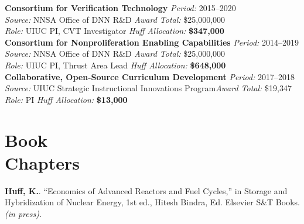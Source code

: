 \documentclass[margin,line]{resume}
\begin{document}
\begin{resume}
    \textbf{Consortium for Verification Technology} \hfill \textsl{Period:} 2015--2020\\ 
    \textsl{Source:} NNSA Office of DNN R\&D \hfill \textsl{Award Total:} \$25,000,000\\
    \textsl{Role:} UIUC PI, CVT Investigator  \hfill \textsl{Huff Allocation:} \textbf{\$347,000}\vspace{2mm}\\%
    \textbf{Consortium for Nonproliferation Enabling Capabilities} \hfill \textsl{Period:} 2014--2019\\ 
    \textsl{Source:} NNSA Office of DNN R\&D \hfill \textsl{Award Total:} \$25,000,000\\
    \textsl{Role:} UIUC PI, Thrust Area Lead  \hfill \textsl{Huff Allocation:} \textbf{\$648,000}\vspace{2mm}\\%
    \textbf{Collaborative, Open-Source Curriculum Development} \hfill \textsl{Period:} 2017--2018\\
    \textsl{Source:} UIUC Strategic Instructional Innovations Program\hfill \textsl{Award Total:} \$19,347\\
    \textsl{Role:} PI \hfill \textsl{Huff Allocation:} \textbf{\$13,000}%
               \vspace{-2mm}
    \section{\mysidestyle Book\\Chapters}
      \begin{bibenum} 
      \item \textbf{Huff, K.}. ``Economics of Advanced Reactors and Fuel 
              Cycles,'' in Storage and Hybridization of Nuclear Energy, 1st 
              ed., Hitesh Bindra, Ed. Elsevier S\&T Books. \textsl{(in 
              press).}
      \end{bibenum}


\end{resume}
\end{document}
